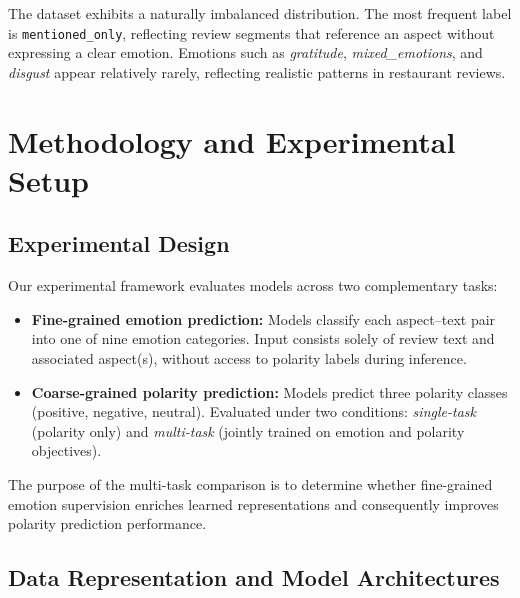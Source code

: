 \documentclass[10pt]{article}
\begin{document}
The dataset exhibits a naturally imbalanced distribution. The most frequent label is \texttt{mentioned\_only}, reflecting review segments that reference an aspect without expressing a clear emotion. Emotions such as \emph{gratitude}, \emph{mixed\_emotions}, and \emph{disgust} appear relatively rarely, reflecting realistic patterns in restaurant reviews.

\section{Methodology and Experimental Setup}

\subsection{Experimental Design}

Our experimental framework evaluates models across two complementary tasks:

\begin{itemize}[leftmargin=*, itemsep=3pt]
  \item \textbf{Fine-grained emotion prediction:} Models classify each aspect--text pair into one of nine emotion categories. Input consists solely of review text and associated aspect(s), without access to polarity labels during inference.
  \item \textbf{Coarse-grained polarity prediction:} Models predict three polarity classes (positive, negative, neutral). Evaluated under two conditions: \emph{single-task} (polarity only) and \emph{multi-task} (jointly trained on emotion and polarity objectives).
\end{itemize}

The purpose of the multi-task comparison is to determine whether fine-grained emotion supervision enriches learned representations and consequently improves polarity prediction performance.

\subsection{Data Representation and Model Architectures}
\end{document}
